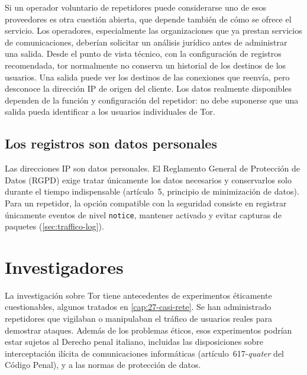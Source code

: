 Si un operador voluntario de repetidores puede considerarse uno de esos proveedores es otra cuestión abierta, que depende también de cómo se ofrece el servicio. Los operadores, especialmente las organizaciones que ya prestan servicios de comunicaciones, deberían solicitar un análisis jurídico antes de administrar una salida. Desde el punto de vista técnico, con la configuración de registros recomendada, tor normalmente no conserva un historial de los destinos de los usuarios. Una salida puede ver los destinos de las conexiones que reenvía, pero desconoce la dirección IP de origen del cliente. Los datos realmente disponibles dependen de la función y configuración del repetidor: no debe suponerse que una salida pueda identificar a los usuarios individuales de Tor.

\subsection{Los registros son datos personales}

Las direcciones IP son datos personales. El Reglamento General de Protección de Datos (RGPD) exige tratar únicamente los datos necesarios y conservarlos solo durante el tiempo indispensable (artículo~5, principio de minimización de datos). Para un repetidor, la opción compatible con la seguridad consiste en registrar únicamente eventos de nivel \texttt{notice}, mantener  activado y evitar capturas de paquetes (\cref{sec:traffico-log}).

\section{Investigadores}\label{sec:legale-ricerca}

La investigación sobre Tor tiene antecedentes de experimentos éticamente cuestionables, algunos tratados en \cref{cap:27-casi-rete}. Se han administrado repetidores que vigilaban o manipulaban el tráfico de usuarios reales para demostrar ataques. Además de los problemas éticos, esos experimentos podrían estar sujetos al Derecho penal italiano, incluidas las disposiciones sobre interceptación ilícita de comunicaciones informáticas (artículo~617-\emph{quater} del Código Penal), y a las normas de protección de datos.

